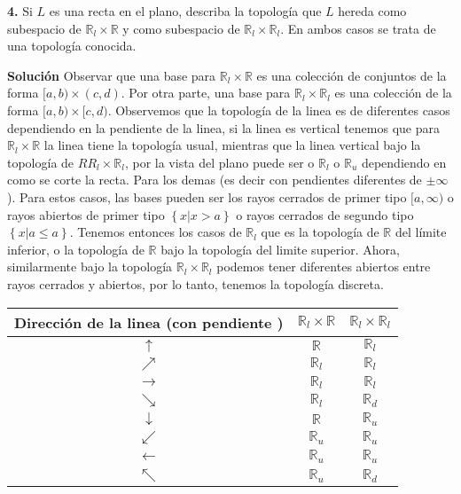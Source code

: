 \documentclass[notitlepage]{article}
\newcommand{\set}[1]{\left\lbrace #1 \right\rbrace}
\newcommand{\RR}{\mathbb{R}}
\begin{document}
\textbf{4.} Si $L$ es una recta en el plano, describa la topología que $L$ hereda como subespacio de $\RR_l \times \RR$ y como subespacio de $\RR_l \times \RR_l $. En ambos casos se trata de una topología conocida.

\textbf{Solución}
Observar que una base para $\RR_l \times \RR$ es una colección de conjuntos de la forma $[a,b) \times (c,d)$. Por otra parte, una base para $\RR_l \times \RR_l$ es una colección de la forma $[a,b) \times [c,d)$. Observemos que la topología de la linea es de diferentes casos dependiendo en la pendiente de la linea, si la linea es vertical tenemos que para $\RR_l \times \RR$ la linea tiene la topología usual, mientras que la linea vertical bajo la topología de $RR_l \times \RR_l$, por la vista del plano puede ser o $\RR_l $ o $ \RR_u$ dependiendo en como se corte la recta. Para los demas (es decir con pendientes diferentes de $ \pm \infty $). Para estos casos, las bases pueden ser los rayos cerrados de primer tipo $ [a,\infty) $ o rayos abiertos de primer tipo $ \set{x | x > a} $ o rayos cerrados de segundo tipo $ \set{x | a \leq a}$. Tenemos entonces los casos de $\RR_l$ que es la topología de $\RR$ del límite inferior, o la topología de $\RR $ bajo la topología del limite superior. Ahora, similarmente bajo la topología $ \RR_l \times \RR_l$ podemos tener diferentes abiertos entre rayos cerrados y abiertos, por lo tanto, tenemos la topología discreta.
\begin{center}
\begin{tabular}{|c|c|c|}
	\hline Dirección de la linea (con pendiente )  & $\RR_l \times \RR$   & $\RR_l \times \RR_l$  \\ 
	\hline $\uparrow$ & $\RR$  & $\RR_l$  \\ 
	\hline $\nearrow$ & $\RR_l$ & $\RR_l$ \\ 
	\hline $\rightarrow $ & $\RR_l$ & $\RR_l$  \\ 
	\hline $\searrow $ & $\RR_l$ & $\RR_d$  \\ 
	\hline $\downarrow $ & $\RR$ & $\RR_u$  \\ 
	\hline $\swarrow $ & $\RR_u$ & $\RR_u$  \\ 
	\hline $ \leftarrow $ & $\RR_u$ & $\RR_u$ \\ 
	\hline $\nwarrow $ & $\RR_u$ & $\RR_d$ \\ 
	\hline 
\end{tabular} 
\end{center}
\vfill
\end{document}
